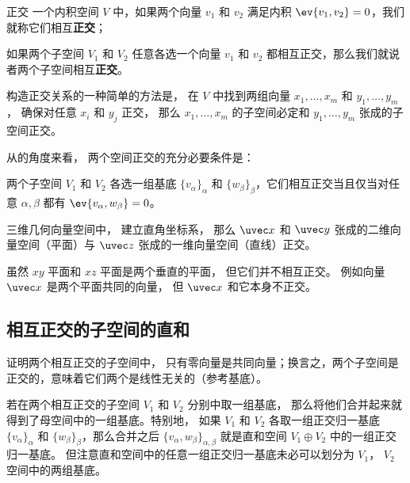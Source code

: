 
\begin{issues}
\issueTODO
\end{issues}



\begin{definition}{正交}
一个内积空间 $V$ 中，如果两个向量 ${v_1}$ 和 ${v_2}$ 满足内积 $\ev{v_1, v_2} = 0$，我们就称它们相互\textbf{正交}；

如果两个子空间 $V_1$ 和 $V_2$ 任意各选一个向量 ${v_1}$ 和 ${v_2}$ 都相互正交，那么我们就说者两个子空间相互\textbf{正交}。
\end{definition}

构造正交关系的一种简单的方法是， 在 $V$ 中找到两组向量 $x_1, \dots, x_m$ 和 $y_1, \dots, y_m$， 确保对任意 $x_i$ 和 $y_j$ 正交， 那么 $x_1, \dots, x_m$ 的子空间必定和 $y_1, \dots, y_m$ 张成的子空间正交。

从的角度来看， 两个空间正交的充分必要条件是：
\begin{theorem}{}
两个子空间 $V_1$ 和 $V_2$ 各选一组基底 $\{v_\alpha\}_\alpha$ 和 $\{w_\beta\}_\beta$，它们相互正交当且仅当对任意 $\alpha, \beta$ 都有 $\ev{v_\alpha, w_\beta} = 0$。
\end{theorem}

\begin{example}{}
三维几何向量空间中， 建立直角坐标系， 那么 $\uvec x$ 和 $\uvec y$ 张成的二维向量空间（平面）与 $\uvec z$ 张成的一维向量空间（直线）正交。

虽然 $xy$ 平面和 $xz$ 平面是两个垂直的平面， 但它们并不相互正交。 例如向量 $\uvec x$ 是两个平面共同的向量， 但 $\uvec x$ 和它本身不正交。
\end{example}

\subsection{相互正交的子空间的直和}

\begin{exercise}{}
证明两个相互正交的子空间中， 只有零向量是共同向量；换言之，两个子空间是正交的，意味着它们两个是线性无关的（参考基底）。
\end{exercise}

若在两个相互正交的子空间 $V_1$ 和 $V_2$ 分别中取一组基底， 那么将他们合并起来就得到了母空间中的一组基底。特别地， 如果 $V_1$ 和 $V_2$ 各取一组正交归一基底 $\{v_\alpha\}_\alpha$ 和 $\{w_\beta\}_\beta$，那么合并之后 $\{v_\alpha, w_\beta\}_{\alpha, \beta}$ 就是直和空间 $V_1 \oplus V_2$ 中的一组正交归一基底。 但注意直和空间中的任意一组正交归一基底未必可以划分为 $V_1$， $V_2$ 空间中的两组基底。

